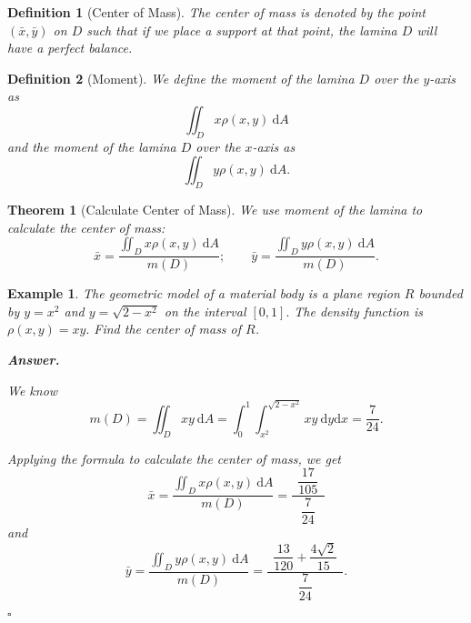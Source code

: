 \documentclass[12pt,a4paper]{article}
\newtheorem{thm}{Theorem}[subsection]
\newtheorem{df}{Definition}[subsection]
\newtheorem{eg}{Example}[subsection]
\newenvironment*{ans}{\par\indent\textbf{\textit{Answer. }}\par}{\par\hfill{$\square$}\par}
\def\dsst{\displaystyle}
\def\d{{\mathrm{d}}}
\def\dx{\d x}
\def\dy{\d y}
\def\dA{\d A}
\def\iintD{\dsst\iint_D}
\begin{document}
\begin{df}[Center of Mass]
	The center of mass is denoted by the point $(\bar{x},\bar{y})$ on $D$ such that if we place a support at that point, the lamina $D$ will have a perfect balance. 	
\end{df}
\begin{df}[Moment]
	We define the moment of the lamina $D$ over the $y$-axis as \[\iintD x\rho(x,y)\ \dA\] and the moment of the lamina $D$ over the $x$-axis as \[\iintD y\rho(x,y)\ \dA.\]
\end{df}
\begin{thm}[Calculate Center of Mass]
	We use moment of the lamina to calculate the center of mass: \[\bar{x}=\dfrac{\iintD x\rho(x,y)\ \dA}{m(D)};\qquad\bar{y}=\dfrac{\iintD y\rho(x,y)\ \dA}{m(D)}.\]
\end{thm}
\begin{eg}
	The geometric model of a material body is a plane region $R$ bounded by $y=x^2$ and $y=\sqrt{2-x^2}$	 on the interval $[0,1].$ The density function is $\rho(x,y)=xy.$ Find the center of mass of $R$.
	\begin{ans}
		We know \[m(D)=\iintD xy\ \dA=\int_0^1\int_{x^2}^{\sqrt{2-x^2}}xy\ \dy\dx=\dfrac{7}{24}.\]\par Applying the formula to calculate the center of mass, we get \[\bar{x}=\dfrac{\iintD x\rho(x,y)\ \dA}{m(D)}=\dfrac{\ \ \dfrac{17}{105}\ \ }{\ \ \dfrac{7}{24}\ \ }\] and \[\bar{y}=\dfrac{\iintD y\rho(x,y)\ \dA}{m(D)}=\dfrac{\ \ \dfrac{13}{120}+\dfrac{4\sqrt{2}}{15}\ \ }{\ \ \dfrac{7}{24}\ \ }.\]
	\end{ans}
\end{eg}
\end{document}
